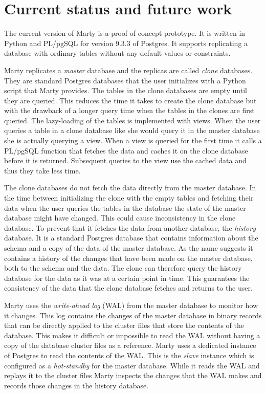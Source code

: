 \chapter{Current status and future work}
\label{ch:current-status}
The current version of Marty is a proof of concept prototype.
It is written in Python and PL/pgSQL for version 9.3.3 of Postgres.
It supports replicating a database with ordinary tables without any default values or constraints.

Marty replicates a \textit{master} database and the replicas are called \textit{clone} databases.
They are standard Postgres databases that the user initializes with a Python script that Marty provides.
The tables in the clone databases are empty until they are queried.
This reduces the time it takes to create the clone database but with the drawback of a longer query time when the tables in the clones are first queried.
The lazy-loading of the tables is implemented with views.
When the user queries a table in a clone database like she would query it in the master database she is actually querying a view.
When a view is queried for the first time it calls a PL/pgSQL function that fetches the data and caches it on the clone database before it is returned.
Subsequent queries to the view use the cached data and thus they take less time.

The clone databases do not fetch the data directly from the master database.
In the time between initializing the clone with the empty tables and fetching their data when the user queries the tables in the database the state of the master database might have changed.
This could cause inconsistency in the clone database.
To prevent that it fetches the data from another database, the \textit{history} database.
It is a standard Postgres database that contains information about the schema and a copy of the data of the master database.
As the name suggests it contains a history of the changes that have been made on the master database, both to the schema and the data.
The clone can therefore query the history database for the data as it was at a certain point in time.
This guarantees the consistency of the data that the clone database fetches and returns to the user.

Marty uses the \textit{write-ahead log} (WAL) from the master database to monitor how it changes.
This log contains the changes of the master database in binary records that can be directly applied to the cluster files that store the contents of the database.
This makes it difficult or impossible to read the WAL without having a copy of the database cluster files as a reference.
Marty uses a dedicated instance of Postgres to read the contents of the WAL.
This is the \textit{slave} instance which is configured as a \textit{hot-standby} for the master database.
While it reads the WAL and replays it to the cluster files Marty inspects the changes that the WAL makes and records those changes in the history database.

